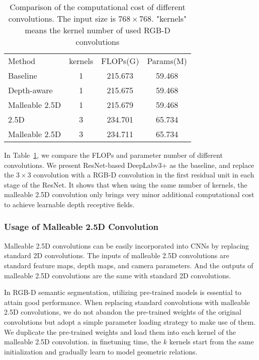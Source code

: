 \documentclass[runningheads]{llncs}
\begin{document}
\begin{table}[htbp]
  \begin{center}
  \caption{
  Comparison of the computational cost of different convolutions.
The input size is $768\times 768$.
"kernels" means the kernel number of used RGB-D convolutions
  }
  \label{table:computation_cost}
  \setlength{\tabcolsep}{10pt}
  \begin{tabular}{lccc}
    \hline\noalign{\smallskip}
    Method & kernels & FLOPs(G) & Params(M)\\
    \noalign{\smallskip}
    \hline
    \noalign{\smallskip}
    Baseline                  & 1 & 215.673 & 59.468 \\
    \noalign{\smallskip}
    \hline
    \noalign{\smallskip}
    Depth-aware\cite{DepthAware}    & 1 & 215.675 & 59.468 \\
    Malleable 2.5D                    & 1 & 215.679 & 59.468 \\
    \noalign{\smallskip}
    \hline
    \noalign{\smallskip}
    2.5D\cite{2_5D}           & 3 & 234.701 & 65.734 \\
    Malleable 2.5D              & 3 & 234.711 & 65.734 \\
    \hline
  \end{tabular}
  \end{center}
\end{table}
In Table~\ref{table:computation_cost}, we compare the FLOPs and parameter number of different convolutions.
We present ResNet-based DeepLabv3+\cite{DeepLabv3plus} as the baseline, and replace the $3\times3$ convolution with a RGB-D convolution in the first residual unit in each stage of the ResNet.
It shows that when using the same number of kernels, the malleable 2.5D convolution only brings very minor additional computational cost to achieve learnable depth receptive fields.



\subsubsection{Usage of Malleable 2.5D Convolution}
Malleable 2.5D convolutions can be easily incorporated into CNNs by replacing standard 2D convolutions.
The inputs of malleable 2.5D convolutions are standard feature maps, depth maps, and camera parameters.
And the outputs of malleable 2.5D convolutions are the same with standard 2D convolutions.

In RGB-D semantic segmentation, utilizing pre-trained models is essential to attain good performance.
When replacing standard convolutions with malleable 2.5D convolutions, we do not abandon the pre-trained weights of the original convolutions but adopt a simple parameter loading strategy to make use of them.
We duplicate the pre-trained weights and load them into each kernel of the malleable 2.5D convolution.
in finetuning time, the $k$ kernels start from the same initialization and gradually learn to model geometric relations.
\end{document}
